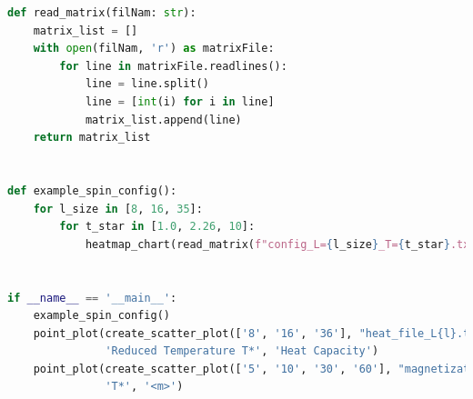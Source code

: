 \documentclass[11pt]{article}
\begin{document}
\begin{small}
\begin{lstlisting}[language=Python, frame=lines, numberstyle=\tiny, stepnumber=5,
            caption=Python Plots Code \label{python-plots}., firstnumber=1,label={lst:code2}]
def read_matrix(filNam: str):
    matrix_list = []
    with open(filNam, 'r') as matrixFile:
        for line in matrixFile.readlines():
            line = line.split()
            line = [int(i) for i in line]
            matrix_list.append(line)
    return matrix_list


def example_spin_config():
    for l_size in [8, 16, 35]:
        for t_star in [1.0, 2.26, 10]:
            heatmap_chart(read_matrix(f"config_L={l_size}_T={t_star}.txt"), l_size, t_star)


if __name__ == '__main__':
    example_spin_config()
    point_plot(create_scatter_plot(['8', '16', '36'], "heat_file_L{l}.txt"),
               'Reduced Temperature T*', 'Heat Capacity')
    point_plot(create_scatter_plot(['5', '10', '30', '60'], "magnetization_file_L{l}.txt"),
               'T*', '<m>')

        \end{lstlisting}
    \end{small}

    \restoregeometry
\end{document}
